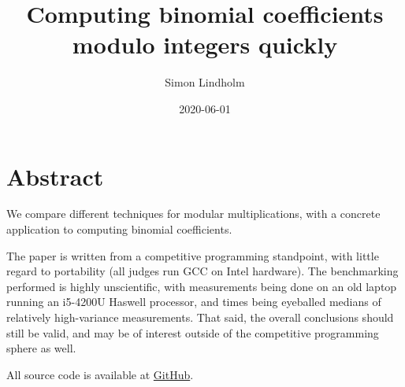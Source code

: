 \documentclass{article}
\title{Computing binomial coefficients modulo integers quickly}
\author{Simon Lindholm}
\date{2020-06-01}
\begin{document}
\maketitle

\section*{Abstract}
We compare different techniques for modular multiplications, with a concrete application to computing binomial coefficients.

The paper is written from a competitive programming standpoint, with little regard to portability (all judges run GCC on Intel hardware).
The benchmarking performed is highly unscientific, with measurements being done on an old laptop running an i5-4200U Haswell processor,
and times being eyeballed medians of relatively high-variance measurements.
That said, the overall conclusions should still be valid, and may be of interest outside of the competitive programming sphere as well.

All source code is available at \href{https://github.com/simonlindholm/simd-book/tree/master/binomial-coefficients}{GitHub}.

\tableofcontents




\end{document}
